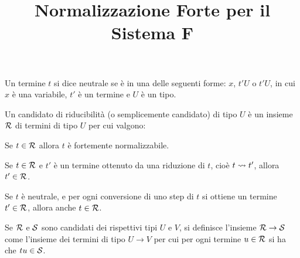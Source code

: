 \documentclass[]{marticle}
\title{\textbf{\huge Normalizzazione Forte per il Sistema F}}
\date{}
\begin{document}
\maketitle

\begin{block}[Definizione]
    Un termine $t$ si dice neutrale se \`e in una delle seguenti forme: $x$,
    $t'U$ o $t'U$, in cui $x$ \`e una variabile, $t'$ \`e un termine e $U$ \`e
    un tipo.
\end{block}

\begin{block}[Definizione]
    Un candidato di riducibilit\`a (o semplicemente candidato) di tipo $U$ \`e
    un insieme $\mathcal{R}$ di termini di tipo $U$ per cui valgono:
    \begin{nlist}[CR1]
        \item Se $t\in\mathcal{R}$ allora $t$ \`e fortemente normalizzabile.
        \item Se $t\in\mathcal{R}$ e $t'$ \`e un termine ottenuto da una riduzione
            di $t$, cio\`e $t\rightsquigarrow t'$, allora $t'\in\mathcal{R}$.
        \item  Se $t$ \`e neutrale, e per ogni conversione di uno step di $t$ si
            ottiene un termine $t'\in\mathcal{R}$, allora anche $t\in\mathcal{R}$.
    \end{nlist}
\end{block}

\begin{block}[Definizione]
    Se $\mathcal{R}$ e $\mathcal{S}$ sono candidati dei rispettivi tipi $U$ e $V$, si
    definisce l'insieme $\mathcal{R}\rightarrow\mathcal{S}$ come l'insieme dei termini
    di tipo $U\rightarrow V$ per cui per ogni termine $u\in\mathcal{R}$ si ha che
    $tu\in\mathcal{S}$.
\end{block}
\end{document}

